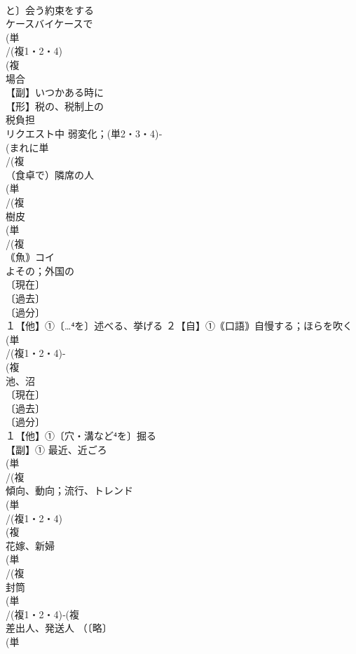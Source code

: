 \documentclass[8pt]{extreport}
\begin{document}
\begin{CJK}{UTF8}{min}
\\	と〕会う約束をする
\\	ケースバイケースで
\\	(単
\\	/(複1・2・4)
\\	(複
\\	場合
\\	【副】いつかある時に 
\\	【形】税の、税制上の 
\\	税負担
\\	リクエスト中	弱変化；(単2・3・4)‐
\\	(まれに単
\\	/(複
\\	（食卓で）隣席の人 
\\	(単
\\	/(複
\\	樹皮 
\\	(単
\\	/(複
\\	｟魚｠コイ 
\\	よその；外国の 
\\	〔現在〕
\\	〔過去〕
\\	〔過分〕
\\	１【他】①〔…⁴を〕述べる、挙げる ２【自】①｟口語｠自慢する；ほらを吹く 
\\	(単
\\	/(複1・2・4)-
\\	(複
\\	池、沼 
\\	〔現在〕
\\	〔過去〕
\\	〔過分〕
\\	１【他】①〔穴・溝など⁴を〕掘る 
\\	【副】① 最近、近ごろ 
\\	(単
\\	/(複
\\	傾向、動向；流行、トレンド 
\\	(単
\\	/(複1・2・4)
\\	(複
\\	花嫁、新婦 
\\	(単
\\	/(複
\\	封筒 
\\	(単
\\	/(複1・2・4)‐(複
\\	差出人、発送人 （〔略〕
\\	(単

\end{CJK}
\end{document}
